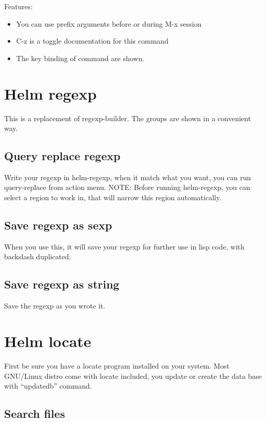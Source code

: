 \documentclass[a4paper,11pt]{article}
\begin{document}
Features:\\
\begin{itemize}
\item You can use prefix arguments before or during M-x session
\end{itemize}
\begin{itemize}
\item C-z is a toggle documentation for this command
\end{itemize}
\begin{itemize}
\item The key binding of command are shown.
\end{itemize}

\section{Helm regexp}
\label{sec:helm-regexp}
This is a replacement of regexp-builder.
The groups are shown in a convenient way.

\subsection{Query replace regexp}
\label{sec:query-replace-regexp}
Write your regexp in helm-regexp, when it match what you want,
you can run query-replace from action menu.
NOTE:
Before running helm-regexp, you can select a region to work in, that will narrow this region
automatically. 
\subsection{Save regexp as sexp}
\label{sec:save-regexp-as}
When you use this, it will save your regexp for further use in lisp code,
with backslash duplicated.

\subsection{Save regexp as string}
\label{sec:save-regexp-as-1}
Save the regexp as you wrote it.

\section{Helm locate}
\label{sec:helm-locate}
First be sure you have a locate program installed on your system.
Most GNU/Linux distro come with locate included, you update or create the data base with
``updatedb'' command.

\subsection{Search files}
\label{sec:search-files}
\end{document}
